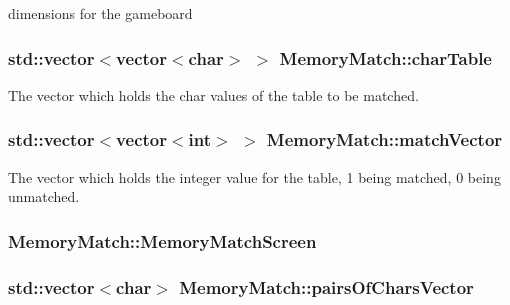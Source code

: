 dimensions for the gameboard 

\hypertarget{classMemoryMatch_af2437cf6ce06147e64feb7dca23715e7}{
\subsubsection[{char\-Table}]{\setlength{\rightskip}{0pt plus 5cm}std\-::vector$<$vector$<$char$>$ $>$ Memory\-Match\-::char\-Table\hspace{0.3cm}{\ttfamily [private]}}}\label{classMemoryMatch_af2437cf6ce06147e64feb7dca23715e7}


The vector which holds the char values of the table to be matched. 

\hypertarget{classMemoryMatch_a87ee5474b348c72d91a359e1bbbe2e10}{
\subsubsection[{match\-Vector}]{\setlength{\rightskip}{0pt plus 5cm}std\-::vector$<$vector$<$int$>$ $>$ Memory\-Match\-::match\-Vector\hspace{0.3cm}{\ttfamily [private]}}}\label{classMemoryMatch_a87ee5474b348c72d91a359e1bbbe2e10}
The vector which holds the integer value for the table, 1 being matched, 0 being unmatched. \hypertarget{classMemoryMatch_a78399975fec5fea7b2102449a4536fcd}{
\subsubsection[{Memory\-Match\-Screen}]{ Memory\-Match\-::\-Memory\-Match\-Screen\hspace{0.3cm}{\ttfamily [private]}}}\label{classMemoryMatch_a78399975fec5fea7b2102449a4536fcd}
\hypertarget{classMemoryMatch_a80336b0b989152fed590a6fa755197bc}{
\subsubsection[{pairs\-Of\-Chars\-Vector}]{\setlength{\rightskip}{0pt plus 5cm}std\-::vector$<$char$>$ Memory\-Match\-::pairs\-Of\-Chars\-Vector\hspace{0.3cm}{\ttfamily [private]}}}\label{classMemoryMatch_a80336b0b989152fed590a6fa755197bc}


